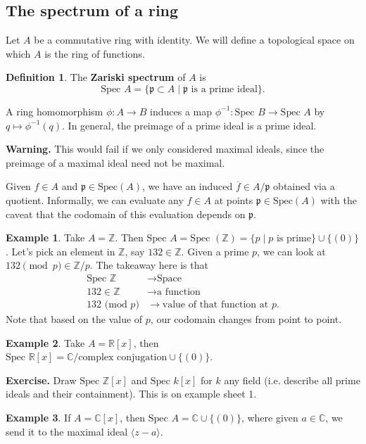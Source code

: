 \documentclass{article}
\theoremstyle{definition}
\newtheorem{example}{Example}[section]
\newtheorem{defn}{Definition}[section]
\begin{document}
\subsection{The spectrum of a ring}


Let $A$ be a commutative ring with identity. We will define a topological space on which $A$ is the ring of functions.

\begin{defn}
    The \textbf{Zariski spectrum} of $A$ is $$\text{Spec }A = \{\mathfrak{p} \subset A \mid \mathfrak{p} \text{ is a prime ideal}\}.$$
\end{defn}
A ring homomorphism $\phi : A \to B$ induces a map $\phi^{-1} : \text{Spec }B \to \text{Spec }A$ by $q \mapsto \phi^{-1}(q)$. In general, the preimage of a prime ideal is a prime ideal.
\vspace{1mm}
 
\textbf{Warning.} This would fail if we only considered maximal ideals, since the preimage of a maximal ideal need not be maximal. 
\vspace{1mm}
 
Given $f \in A$ and $\mathfrak{p} \in \text{Spec}(A)$, we have an induced $\overline{f} \in A/\mathfrak{p}$ obtained via a quotient. Informally, we can evaluate any $f \in A$ at points $\mathfrak{p} \in \text{Spec}(A)$ with the caveat that the codomain of this evaluation depends on $\mathfrak{p}$.

\begin{example}
    Take $A = \mathbb{Z}$. Then $\text{Spec }A  = \text{Spec }(\mathbb{Z}) = \{p \mid p \text{ is prime}\} \cup \{(0)\}$. Let's pick an element in $\mathbb{Z}$, say $132 \in \mathbb{Z}$. Given a prime $p$, we can look at ${132\pmod{p}} \in \mathbb{Z}/p$. The takeaway here is that 
    \begin{align*}
        \text{Spec }\mathbb{Z} &\rightarrow \text{Space}\\
        132 \in \mathbb{Z} &\rightarrow \text{a function}\\
        132 \text{ (mod }p) &\rightarrow \text{value of that function at }p.
    \end{align*}
    Note that based on the value of $p$, our codomain changes from point to point.
\end{example}
\begin{example}
    Take $A = \mathbb{R}[x]$, then $\text{Spec }\mathbb{R}[x] = \mathbb{C}/ \text{complex conjugation} \cup \{(0)\}$. 
\end{example}
\textbf{Exercise.} Draw $\text{Spec }\mathbb{Z}[x]$ and $\text{Spec }k[x]$ for $k$ any field (i.e. describe all prime ideals and their containment). This is on example sheet 1.
\begin{example}
    If $A = \mathbb{C}[x]$, then $\text{Spec }A = \mathbb{C} \cup\{(0)\}$, where given $a \in \mathbb{C}$, we send it to the maximal ideal $\langle z-a\rangle$.
\end{example}
\end{document}
